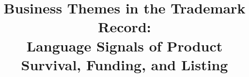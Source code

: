 
\newcommand{\onlineappendixnote}{Online appendix link withheld for anonymized review; available from the editors.}
\graphicspath{{../../}}
\makeatletter{}\makeatother
\title{\bfseries Business Themes in the Trademark Record:\\
\large Language Signals of Product Survival, Funding, and Listing}
\author{}
\date{}


\maketitle












\appendix





